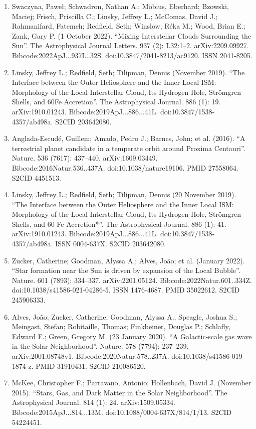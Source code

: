 \begin{enumerate}
\item Swaczyna, Paweł; Schwadron, Nathan A.; Möbius, Eberhard; Bzowski, Maciej; Frisch, Priscilla C.; Linsky, Jeffrey L.; McComas, David J.; Rahmanifard, Fatemeh; Redfield, Seth; Winslow, Réka M.; Wood, Brian E.; Zank, Gary P. (1 October 2022). ``Mixing Interstellar Clouds Surrounding the Sun''. The Astrophysical Journal Letters. 937 (2): L32:1–2. arXiv:2209.09927. Bibcode:2022ApJ...937L..32S. doi:10.3847/2041-8213/ac9120. ISSN 2041-8205.
\item Linsky, Jeffrey L.; Redfield, Seth; Tilipman, Dennis (November 2019). ``The Interface between the Outer Heliosphere and the Inner Local ISM: Morphology of the Local Interstellar Cloud, Its Hydrogen Hole, Strömgren Shells, and 60Fe Accretion''. The Astrophysical Journal. 886 (1): 19. arXiv:1910.01243. Bibcode:2019ApJ...886...41L. doi:10.3847/1538-4357/ab498a. S2CID 203642080.
\item Anglada-Escudé, Guillem; Amado, Pedro J.; Barnes, John; et al. (2016). ``A terrestrial planet candidate in a temperate orbit around Proxima Centauri''. Nature. 536 (7617): 437–440. arXiv:1609.03449. Bibcode:2016Natur.536..437A. doi:10.1038/nature19106. PMID 27558064. S2CID 4451513.
\item Linsky, Jeffrey L.; Redfield, Seth; Tilipman, Dennis (20 November 2019). ``The Interface between the Outer Heliosphere and the Inner Local ISM: Morphology of the Local Interstellar Cloud, Its Hydrogen Hole, Strömgren Shells, and 60 Fe Accretion*''. The Astrophysical Journal. 886 (1): 41. arXiv:1910.01243. Bibcode:2019ApJ...886...41L. doi:10.3847/1538-4357/ab498a. ISSN 0004-637X. S2CID 203642080.
\item Zucker, Catherine; Goodman, Alyssa A.; Alves, João; et al. (January 2022). ``Star formation near the Sun is driven by expansion of the Local Bubble''. Nature. 601 (7893): 334–337. arXiv:2201.05124. Bibcode:2022Natur.601..334Z. doi:10.1038/s41586-021-04286-5. ISSN 1476-4687. PMID 35022612. S2CID 245906333.
\item Alves, João; Zucker, Catherine; Goodman, Alyssa A.; Speagle, Joshua S.; Meingast, Stefan; Robitaille, Thomas; Finkbeiner, Douglas P.; Schlafly, Edward F.; Green, Gregory M. (23 January 2020). ``A Galactic-scale gas wave in the Solar Neighborhood''. Nature. 578 (7794): 237–239. arXiv:2001.08748v1. Bibcode:2020Natur.578..237A. doi:10.1038/s41586-019-1874-z. PMID 31910431. S2CID 210086520.
\item McKee, Christopher F.; Parravano, Antonio; Hollenbach, David J. (November 2015). ``Stars, Gas, and Dark Matter in the Solar Neighborhood''. The Astrophysical Journal. 814 (1): 24. arXiv:1509.05334. Bibcode:2015ApJ...814...13M. doi:10.1088/0004-637X/814/1/13. S2CID 54224451.

\end{enumerate}
